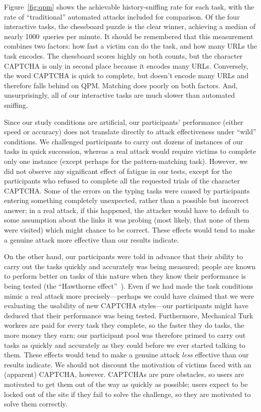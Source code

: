 \documentclass[conference]{IEEEtran}
\begin{document}
Figure~\ref{fig:qpm} shows the achievable history-sniffing rate for
each task, with the rate of “traditional” automated attacks included
for comparison. Of the four interactive tasks, the chessboard puzzle
is the clear winner, achieving a median of nearly 1000~queries per
minute.  It should be remembered that this measurement combines two
factors: how fast a victim can do the task, and how many URLs the task
encodes.  The chessboard scores highly on both counts, but the
character CAPTCHA is only in second place because it encodes
many URLs.  Conversely, the word CAPTCHA is quick to complete,
but doesn't encode many URLs and therefore falls behind on QPM.
Matching does poorly on both factors.  And, unsurprisingly, all of our
interactive tasks are much slower than automated sniffing.

Since our study conditions are artificial, our participants'
performance (either speed or accuracy) does not translate directly to
attack effectiveness under “wild” conditions.  We challenged
participants to carry out dozens of instances of our tasks in quick
succession, whereas a real attack would require victims to complete
only one instance (except perhaps for the pattern-matching task).
However, we did not observe any significant effect of fatigue in our
tests, except for the participants who refused to complete all the
requested trials of the character CAPTCHA.  Some of the errors on the
typing tasks were caused by participants entering something completely
unexpected, rather than a possible but incorrect answer; in a real
attack, if this happened, the attacker would have to default to some
assumption about the links it was probing (most likely, that none of
them were visited) which might chance to be correct.  These effects
would tend to make a genuine attack more effective than our results
indicate.

On the other hand, our participants were told in advance that their
ability to carry out the tasks quickly and accurately was being
measured; people are known to perform better on tasks of this nature
when they know their performance is being tested (the “Hawthorne
effect”~\cite{hawthorne}).  Even if we had made the task conditions
mimic a real attack more precisely---perhaps we could have claimed
that we were evaluating the usability of new CAPTCHA styles---our
participants might have deduced that their performance was being
tested.  Furthermore, Mechanical Turk workers are paid for every task
they complete, so the faster they do tasks, the more money they earn;
our participant pool was therefore primed to carry out tasks as
quickly and accurately as they could before we ever started talking to
them.  These effects would tend to make a genuine attack \emph{less}
effective than our results indicate.  We should not discount the
motivation of victims faced with an (apparent) CAPTCHA, however.
CAPTCHAs are pure obstacles, so users are motivated to get them out of
the way as quickly as possible; users expect to be locked out of the
site if they fail to solve the challenge, so they are motivated to
solve them correctly.
\end{document}
